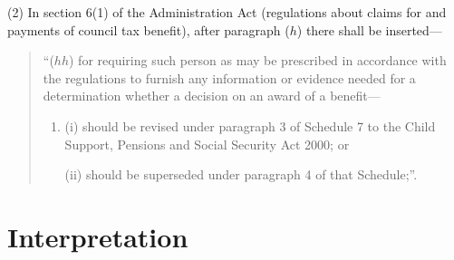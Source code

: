 \documentclass[12pt,a4paper]{article}
\begin{document}
(2) In section 6(1)  of the Administration Act (regulations about claims for and payments of council tax benefit), after paragraph ($h$)  there shall be inserted—
\begin{quotation}
“($hh$) for requiring such person as may be prescribed in accordance with the regulations to furnish any information or evidence needed for a determination whether a decision on an award of a benefit—
\begin{enumerate}\item[]
(i) should be revised under paragraph 3 of Schedule 7 to the Child Support, Pensions and Social Security Act 2000; or

(ii) should be superseded under paragraph 4 of that Schedule;”.
\end{enumerate}
\end{quotation}



%
%
%
\section*{Interpretation}
\end{document}
